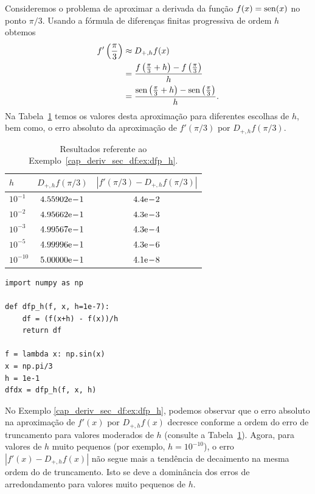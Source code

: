 \begin{ex}\label{cap_deriv_sec_df:ex:dfp_h}
  Consideremos o problema de aproximar a derivada da função $f(x) = \operatorname{sen}(x)$ no ponto $\pi/3$. Usando a fórmula de diferenças finitas progressiva de ordem $h$ obtemos
  \begin{subequations}
    \begin{align}
      f'\left(\frac{\pi}{3}\right) &\approx D_{+,h}f(x)\\
      &= \frac{f\left(\frac{\pi}{3}+h\right)-f\left(\frac{\pi}{3}\right)}{h}\\
      &= \frac{\operatorname{sen}\left(\frac{\pi}{3}+h\right)-\operatorname{sen}\left(\frac{\pi}{3}\right)}{h}. 
    \end{align}
\end{subequations}
Na Tabela~\ref{cap_deriv_sec_df:tab:ex_dfp_h} temos os valores desta aproximação para diferentes escolhas de $h$, bem como, o erro absoluto da aproximação de $f'(\pi/3)$ por $D_{+,h}f(\pi/3)$.

\begin{table}[h!]
  \centering
  \caption{Resultados referente ao Exemplo~\ref{cap_deriv_sec_df:ex:dfp_h}.}
  \begin{tabular}{l|c|c}
    $h$ & $D_{+,h}f(\pi/3)$ & $|f'(\pi/3)-D_{+,h}f(\pi/3)|$\\ \hline
    $10^{-1}$ & $4.55902\mathrm{e}\!-\!1$ & $4.4\mathrm{e}\!-\!2$ \\
    $10^{-2}$ & $4.95662\mathrm{e}\!-\!1$ & $4.3\mathrm{e}\!-\!3$ \\
    $10^{-3}$ & $4.99567\mathrm{e}\!-\!1$ & $4.3\mathrm{e}\!-\!4$ \\
    $10^{-5}$ & $4.99996\mathrm{e}\!-\!1$ & $4.3\mathrm{e}\!-\!6$ \\
    $10^{-10}$ & $5.00000\mathrm{e}\!-\!1$ & $4.1\mathrm{e}\!-\!8$ \\\hline
  \end{tabular}
  \label{cap_deriv_sec_df:tab:ex_dfp_h}
\end{table}

\begin{lstlisting}[caption=dfp\_h.py]
import numpy as np

def dfp_h(f, x, h=1e-7):
    df = (f(x+h) - f(x))/h
    return df

f = lambda x: np.sin(x)
x = np.pi/3
h = 1e-1
dfdx = dfp_h(f, x, h)
\end{lstlisting}
\end{ex}

\begin{obs}
  No Exemplo \ref{cap_deriv_sec_df:ex:dfp_h}, podemos observar que o erro absoluto na aproximação de $f'(x)$ por $D_{+,h}f(x)$ decresce conforme a ordem do erro de truncamento para valores moderados de $h$ (consulte a Tabela~\ref{cap_deriv_sec_df:tab:ex_dfp_h}). Agora, para valores de $h$ muito pequenos (por exemplo, $h=10^{-10}$), o erro $|f'(x)-D_{+,h}f(x)|$ não segue mais a tendência de decaimento na mesma ordem do de truncamento. Isto se deve a dominância dos erros de arredondamento para valores muito pequenos de $h$.
\end{obs}

